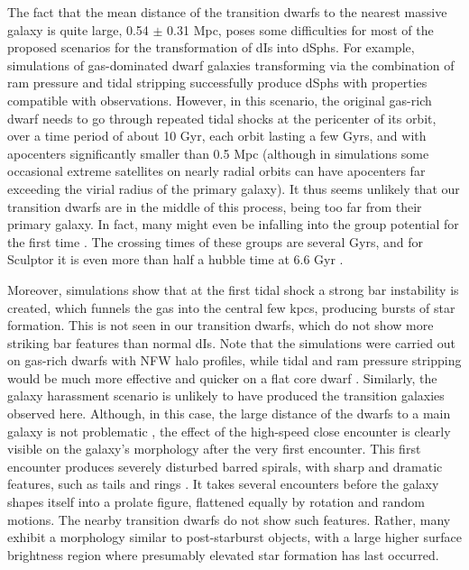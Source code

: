 \documentclass[preprint]{aastex}
\begin{document}
The fact that the mean distance of the transition dwarfs to the nearest
massive galaxy is quite large, 0.54 $\pm$ 0.31 Mpc, poses some difficulties
for most of the proposed scenarios for the transformation of dIs into
dSphs. For example, simulations of gas-dominated dwarf galaxies transforming
 via the combination of ram pressure and tidal stripping
\citep{mmwsm06, mkmw07} successfully produce dSphs with properties compatible 
with observations. However, in this scenario, the original gas-rich dwarf needs
to go through repeated tidal shocks at the pericenter of its orbit, over a
time period of about 10 Gyr, each orbit lasting a few Gyrs, and with 
apocenters significantly smaller than 0.5 Mpc (although in simulations some
occasional extreme satellites on nearly radial orbits can have apocenters 
far exceeding the virial radius of the primary galaxy). It thus seems unlikely
that our transition dwarfs are in the middle of this process, being too far
from their primary galaxy. In fact, many might even be infalling into
the group potential for the first time \citep[as shown for the Local Group 
with orbit tracing by][]{p89}. The crossing times of these groups are several Gyrs,  
and for Sculptor it is even more than half a hubble time at 6.6 Gyr \citep{k05}.

Moreover, simulations
show that at the first tidal shock a strong bar instability is created, which 
funnels the gas into the central few kpcs, producing bursts of star formation.
This is not seen in our transition dwarfs, which do not show more striking bar features 
than normal
dIs. Note that the \citet{mmwsm06, mkmw07} simulations were carried out
on gas-rich dwarfs with NFW halo profiles, while tidal and ram pressure stripping
would be much more effective and quicker on a flat core dwarf \citep[which we would
argue to correspond better to the observations in any case, e.g.,][]{ccf00}.
Similarly, the galaxy harassment scenario is unlikely to have produced
the transition galaxies observed here. Although, in this case, the large distance
of the dwarfs to a main galaxy is not problematic \citep[in the][simulations
the greatest harassment was obtained for galaxies on elongated orbits with 
apocenters typically of 600 kpc]{mkldo96}, the effect of the high-speed close 
encounter is 
clearly visible on the galaxy's morphology after the very first encounter.
This first encounter produces severely disturbed barred spirals, with sharp
and dramatic features, such as tails and rings \citep{mkldo96}. It takes
several encounters before the galaxy shapes itself into a prolate figure, flattened
equally by rotation and random motions. The nearby transition dwarfs do not
show such features. Rather, many exhibit a morphology similar to post-starburst 
objects, with a large
higher surface brightness region where presumably elevated star formation has
last occurred. 
\end{document}

